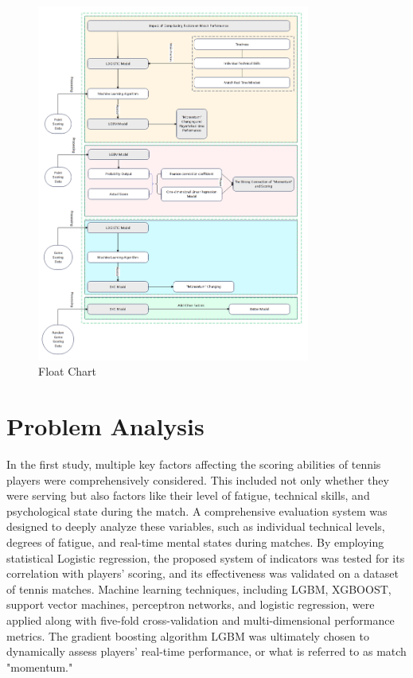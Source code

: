 \documentclass{article}
\begin{document}
\begin{figure}[H]
      \centering
      \includegraphics[width=0.8\textwidth]{floatChart.png}
      \caption{Float Chart}
\end{figure}
\section{Problem Analysis}
In the first study, multiple key factors affecting the scoring abilities of tennis players were comprehensively considered. This included not only whether they were serving but also factors like their level of fatigue, technical skills, and psychological state during the match. A comprehensive evaluation system was designed to deeply analyze these variables, such as individual technical levels, degrees of fatigue, and real-time mental states during matches. By employing statistical Logistic regression, the proposed system of indicators was tested for its correlation with players' scoring, and its effectiveness was validated on a dataset of tennis matches. Machine learning techniques, including LGBM, XGBOOST, support vector machines, perceptron networks, and logistic regression, were applied along with five-fold cross-validation and multi-dimensional performance metrics. The gradient boosting algorithm LGBM was ultimately chosen to dynamically assess players' real-time performance, or what is referred to as match "momentum."
\end{document}
